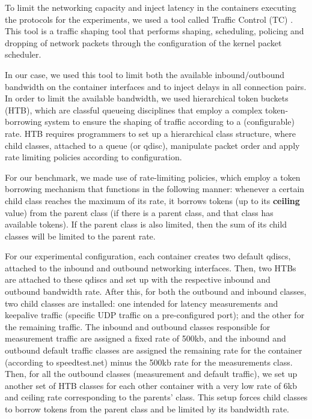 
To limit the networking capacity and inject latency in the containers executing the protocols for the experiments, we used a tool called Traffic Control (TC) \cite{tc_man_page}. This tool is a traffic shaping tool that performs shaping, scheduling, policing and dropping of network packets through the configuration of the kernel packet scheduler. 


In our case, we used this tool to limit both the available inbound/outbound bandwidth on the container interfaces and to inject delays in all connection pairs. In order to limit the available bandwidth, we used hierarchical token buckets (HTB), which are classful queueing disciplines that employ a complex token-borrowing system to ensure the shaping of traffic according to a (configurable) rate. HTB requires programmers to set up a hierarchical class structure, where child classes, attached to a queue (or qdisc), manipulate packet order and apply rate limiting policies according to configuration.

For our benchmark, we made use of rate-limiting policies, which employ a token borrowing mechanism that functions in the following manner: whenever a certain child class reaches the maximum of its rate, it borrows tokens (up to its \textbf{ceiling} value) from the parent class (if there is a parent class, and that class has available tokens). If the parent class is also limited, then the sum of its child classes will be limited to the parent rate. 

For our experimental configuration, each container creates two default qdiscs, attached to the inbound and outbound networking interfaces. Then, two HTBs are attached to these qdiscs and set up with the respective inbound and outbound bandwidth rate. After this, for both the outbound and inbound classes, two child classes are installed: one intended for latency measurements and keepalive traffic (specific UDP traffic on a pre-configured port); and the other for the remaining traffic. The inbound and outbound classes responsible for measurement traffic are assigned a fixed rate of 500kb, and the inbound and outbound default traffic classes are assigned the remaining rate for the container (according to speedtest.net) minus the 500kb rate for the measurements class. Then, for all the outbound classes (measurement and default traffic), we set up another set of HTB classes for each other container with a very low rate of 6kb and ceiling rate corresponding to the parents' class. This setup forces child classes to borrow tokens from the parent class and be limited by its bandwidth rate.

